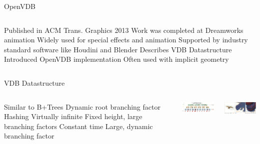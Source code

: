 \begin{frame}{OpenVDB}
\begin{columns}
\centering
\begin{outline}
    \1 Published in ACM Trans. Graphics 2013 \cite{Museth2013}
    \1 Work was completed at Dreamworks animation
    \1 Widely used for special effects and animation
      \2 Supported by industry standard software like Houdini and Blender
    \1 Describes VDB Datastructure
    \1 Introduced OpenVDB implementation
    \1 Often used with implicit geometry
\end{outline}
\centering
{}


\end{columns}

\end{frame}

\begin{frame}{VDB Datastructure}
\begin{columns}
\centering
\begin{outline}
    \1 Similar to B+Trees
    \1 Dynamic root branching factor
      \2 Hashing
      \2 Virtually infinite
    \1 Fixed height, large branching factors
    \1 Constant time 
    \1 Large, dynamic branching factor 
\end{outline}
\centering
\includegraphics[width=5cm]{open_vdb_data_structure.png}

\includegraphics[width=5cm]{open_vdb_visual_aid.png} 


\end{columns}

\end{frame}
